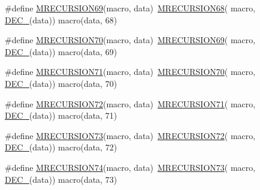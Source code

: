 \begin{DoxyCompactItemize}
\item 
\#define \mbox{\hyperlink{group__group__sam0__utils__mrecursion_ga0298145e1a282f5e0264927f7d41f8d3}{M\+R\+E\+C\+U\+R\+S\+I\+O\+N69}}(macro,  data)~\mbox{\hyperlink{group__group__sam0__utils__mrecursion_gaa350567fcc5f153cda9d1cfcff214a99}{M\+R\+E\+C\+U\+R\+S\+I\+O\+N68}}(  macro, \mbox{\hyperlink{group__group__sam0__utils__mrecursion_ga1d23d683797679dca8c3512a54a5dcae}{D\+E\+C\+\_\+}}(data))   macro(data, 68)
\item 
\#define \mbox{\hyperlink{group__group__sam0__utils__mrecursion_gaf4c046319eba8a2f6684263fb690ad64}{M\+R\+E\+C\+U\+R\+S\+I\+O\+N70}}(macro,  data)~\mbox{\hyperlink{group__group__sam0__utils__mrecursion_ga0298145e1a282f5e0264927f7d41f8d3}{M\+R\+E\+C\+U\+R\+S\+I\+O\+N69}}(  macro, \mbox{\hyperlink{group__group__sam0__utils__mrecursion_ga1d23d683797679dca8c3512a54a5dcae}{D\+E\+C\+\_\+}}(data))   macro(data, 69)
\item 
\#define \mbox{\hyperlink{group__group__sam0__utils__mrecursion_ga53ea6fd4218fb470ef74e2e6ded573db}{M\+R\+E\+C\+U\+R\+S\+I\+O\+N71}}(macro,  data)~\mbox{\hyperlink{group__group__sam0__utils__mrecursion_gaf4c046319eba8a2f6684263fb690ad64}{M\+R\+E\+C\+U\+R\+S\+I\+O\+N70}}(  macro, \mbox{\hyperlink{group__group__sam0__utils__mrecursion_ga1d23d683797679dca8c3512a54a5dcae}{D\+E\+C\+\_\+}}(data))   macro(data, 70)
\item 
\#define \mbox{\hyperlink{group__group__sam0__utils__mrecursion_gaa07d3566091f78000fae05cf0e83c5b3}{M\+R\+E\+C\+U\+R\+S\+I\+O\+N72}}(macro,  data)~\mbox{\hyperlink{group__group__sam0__utils__mrecursion_ga53ea6fd4218fb470ef74e2e6ded573db}{M\+R\+E\+C\+U\+R\+S\+I\+O\+N71}}(  macro, \mbox{\hyperlink{group__group__sam0__utils__mrecursion_ga1d23d683797679dca8c3512a54a5dcae}{D\+E\+C\+\_\+}}(data))   macro(data, 71)
\item 
\#define \mbox{\hyperlink{group__group__sam0__utils__mrecursion_ga186bc5d8359651d36b5ddcf03f37d334}{M\+R\+E\+C\+U\+R\+S\+I\+O\+N73}}(macro,  data)~\mbox{\hyperlink{group__group__sam0__utils__mrecursion_gaa07d3566091f78000fae05cf0e83c5b3}{M\+R\+E\+C\+U\+R\+S\+I\+O\+N72}}(  macro, \mbox{\hyperlink{group__group__sam0__utils__mrecursion_ga1d23d683797679dca8c3512a54a5dcae}{D\+E\+C\+\_\+}}(data))   macro(data, 72)
\item 
\#define \mbox{\hyperlink{group__group__sam0__utils__mrecursion_ga8335acfacb3b7c1519b263cc873db045}{M\+R\+E\+C\+U\+R\+S\+I\+O\+N74}}(macro,  data)~\mbox{\hyperlink{group__group__sam0__utils__mrecursion_ga186bc5d8359651d36b5ddcf03f37d334}{M\+R\+E\+C\+U\+R\+S\+I\+O\+N73}}(  macro, \mbox{\hyperlink{group__group__sam0__utils__mrecursion_ga1d23d683797679dca8c3512a54a5dcae}{D\+E\+C\+\_\+}}(data))   macro(data, 73)

\end{DoxyCompactItemize}
